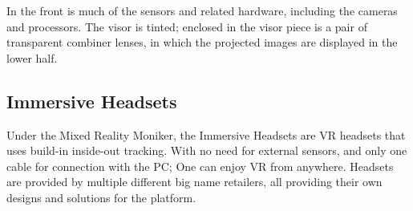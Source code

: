     In the front is much of the sensors and related hardware, including the cameras and processors. The visor is tinted; enclosed in the visor piece is a pair of transparent combiner lenses, in which the projected images are displayed in the lower half. %

    \subsection{Immersive Headsets}
    Under the Mixed Reality Moniker, the Immersive Headsets are VR headsets that uses build-in inside-out tracking. With no need for external sensors, and only one cable for connection with the PC; One can enjoy VR from anywhere. 
    Headsets are provided by multiple different big name retailers, all providing their own designs and solutions for the platform.
